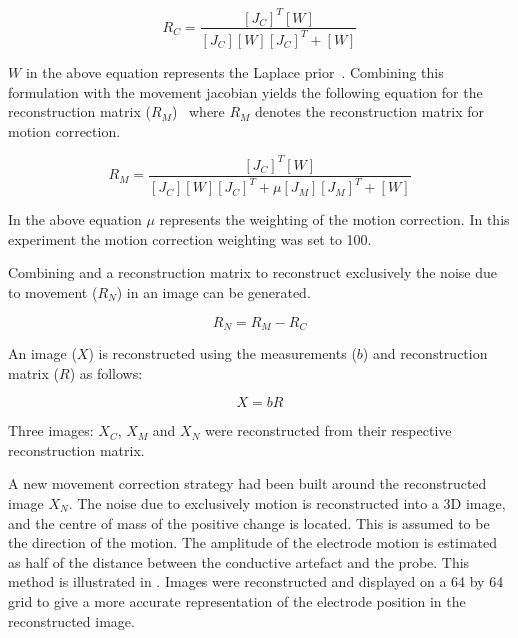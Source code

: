 \begin{equation}\label{eq:regular_rm}
	R_C = \frac{[J_C]^T [W]}{[J_C] [W] [J_C]^T + [W]}
\end{equation}

$W$ in the above equation represents the Laplace prior~\parencite{soleimani_imaging_2006}.
Combining this formulation with the movement jacobian yields the following equation 
for the reconstruction matrix ($R_M$)~\parencite{soleimani_imaging_2006} where $R_M$
denotes the reconstruction matrix for motion correction.

\begin{equation}\label{eq:motion_rm}
	R_M = \frac{[J_C]^T [W]}{[J_C] [W] [J_C]^T + \mu [J_M][J_M]^T + [W]}
\end{equation}

In the above equation $\mu$ represents the weighting of the motion correction. 
In this experiment the motion correction weighting was set to 100. 

Combining  and  a reconstruction
matrix to reconstruct exclusively the noise due to movement ($R_N$) 
in an image can be generated.

\begin{equation}
	R_N = R_M - R_C
\end{equation}

An image ($X$) is reconstructed using 
the measurements ($b$) and reconstruction matrix ($R$) as follows:

\begin{equation}
	X = bR
\end{equation}

Three images: $X_C$, $X_M$ and $X_N$ were reconstructed from their 
respective reconstruction matrix. 

A new movement correction strategy had been built 
around the reconstructed image $X_N$.
The noise due to exclusively motion is reconstructed into a 
3D image, and the centre of mass of the positive change is located. 
This is assumed to be the direction of the motion. The amplitude of the electrode 
motion is estimated as half of the distance between the 
conductive artefact and the probe. This method is illustrated in
. Images were reconstructed and displayed 
on a 64 by 64 grid to give a more accurate representation of the 
electrode position in the reconstructed image.

